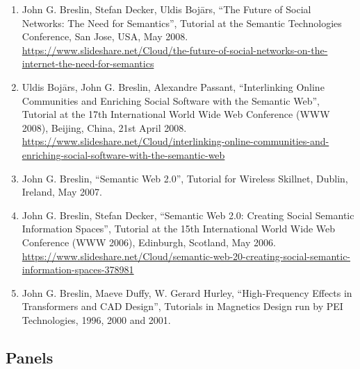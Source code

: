\documentclass[10pt,a4paper]{res} %
\begin{document}
\begin{resume}
\begin{enumerate}
\item John G. Breslin, Stefan Decker, Uldis Boj\={a}rs, ``The Future of Social Networks: The Need for Semantics'', Tutorial at the Semantic Technologies Conference, San Jose, USA, May 2008. \url{https://www.slideshare.net/Cloud/the-future-of-social-networks-on-the-internet-the-need-for-semantics}
\item Uldis Boj\={a}rs, John G. Breslin, Alexandre Passant, ``Interlinking Online Communities and Enriching Social Software with the Semantic Web'', Tutorial at the 17th International World Wide Web Conference (WWW 2008), Beijing, China, 21st April 2008. \url{https://www.slideshare.net/Cloud/interlinking-online-communities-and-enriching-social-software-with-the-semantic-web}
\item John G. Breslin, ``Semantic Web 2.0'', Tutorial for Wireless Skillnet, Dublin, Ireland, May 2007. %
\item John G. Breslin, Stefan Decker, ``Semantic Web 2.0: Creating Social Semantic Information Spaces'', Tutorial at the 15th International World Wide Web Conference (WWW 2006), Edinburgh, Scotland, May 2006. \url{https://www.slideshare.net/Cloud/semantic-web-20-creating-social-semantic-information-spaces-378981}
\item John G. Breslin, Maeve Duffy, W. Gerard Hurley, ``High-Frequency Effects in Transformers and CAD Design'', Tutorials in Magnetics Design run by PEI Technologies, 1996, 2000 and 2001. %
\end{enumerate}

\subsection*{Panels}


\end{resume}
\end{document}
